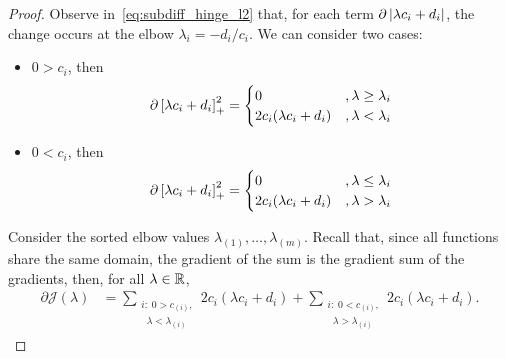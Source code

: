 \begin{proof}
    Observe in~\eqref{eq:subdiff_hinge_l2} that, for each term $\partial \left|\lambda c_i + d_i\right|$, the change occurs at the elbow $\lambda_{i} = - d_ i / c_i$. We can consider two cases:
    \begin{itemize}
        \item $0 > c_i$, then
        \begin{equation}
            \nonumber
            \begin{aligned}
                \partial \left[\lambda c_i + d_i\right]_{+}^2 = 
                \begin{cases}
                    0 &, \lambda \geq \lambda_i \\
                    2 c_i (\lambda c_i + d_i) &, \lambda < \lambda_i \\
                \end{cases}
            \end{aligned}
        \end{equation}
        \item $0 < c_i$, then
        \begin{equation}
            \nonumber
            \begin{aligned}
                \partial \left[\lambda c_i + d_i\right]_{+}^2 = 
                \begin{cases}
                    0 &, \lambda \leq \lambda_i \\
                    2 c_i (\lambda c_i + d_i) &, \lambda > \lambda_i \\
                \end{cases}
            \end{aligned}
        \end{equation}
    \end{itemize}
    Consider the sorted elbow values $\lambda_{(1)}, \ldots, \lambda_{(m)}$.
    Recall that, since all functions share the same domain, the gradient of the sum is the gradient sum of the gradients, then, for all $\lambda \in \mathbb{R}$,
    \begin{equation}\nonumber
        \begin{aligned}
            \partial \mathcal{J}(\lambda) &=  \sum_{\substack{i:\; 0 > c_{(i)},\\ \;\; \lambda < \lambda_{(i)}}} {2 c_i (\lambda c_i + d_i)} + \sum_{\substack{i:\; 0 < c_{(i)},\\ \;\; \lambda > \lambda_{(i)}}} {2 c_i (\lambda c_i + d_i)}  .
        \end{aligned}        

\end{equation}
\end{proof}
